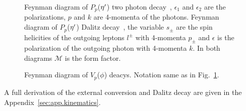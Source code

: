  \begin{figure}[h!]\begin{center}
 		\quad
 		\caption[Feynman diagram of $P_p$($\etaP$) two photon decay and Dalitz decay]{\label{fig:piz.alldecay}Feynman diagram of $P_p$($\etaP$) two photon decay~, $\epsilon_1$ and $\epsilon_2$ are the polarizations, $p$ and $k$ are 4-momenta of the photons.  Feynman diagram of $P_p$($\etaP$) Dalitz decay~, the variable $s_\pm$ are the spin helicities of the outgoing leptons $l^\pm$ with 4-momenta $p_{\pm}$ and $\epsilon$ is the polarization of the outgoing photon with 4-momenta $k$. In both diagrams $\mathcal{M}$ is the form factor.}
\end{center}\end{figure}
\begin{figure}[h!]\begin{center}
 	 		\quad
 	 		\caption[Feynman diagram of $V_p$($\phi$) decays]{\label{fig:phi.alldecay}Feynman diagram of $V_p$($\phi$) deacys. Notation same as in Fig.~\ref{fig:piz.alldecay}.}
\end{center}\end{figure}
 A full derivation of the external conversion and Dalitz decay are given in the Appendix~\ref{sec:app.kinematics}.
